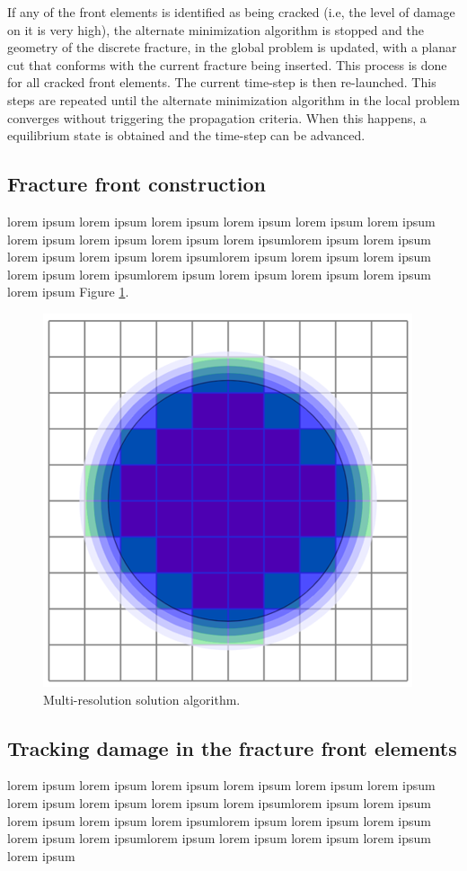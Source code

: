 If any of the front elements is identified as being cracked (i.e, the level of damage on it is very high), the alternate minimization algorithm is stopped and the geometry of the discrete fracture, in the global problem is updated, with a planar cut that conforms with the current fracture being inserted. This process is done for all cracked front elements. The current time-step is then re-launched. This steps are repeated until the alternate minimization algorithm in the local problem converges without triggering the propagation criteria. When this happens, a equilibrium state is obtained and the time-step can be advanced.

\subsection{Fracture front construction}

lorem ipsum lorem ipsum lorem ipsum lorem ipsum lorem ipsum lorem ipsum lorem ipsum lorem ipsum lorem ipsum lorem ipsumlorem ipsum lorem ipsum lorem ipsum lorem ipsum lorem ipsumlorem ipsum lorem ipsum lorem ipsum lorem ipsum lorem ipsumlorem ipsum lorem ipsum lorem ipsum lorem ipsum lorem ipsum Figure \ref{fig:lorem0}.

\begin{figure}[h]
    \centering
    \includegraphics[width=0.5\linewidth]{Chapter4/figures/blue_circle.png}
    \caption{Multi-resolution solution algorithm.}
    \label{fig:lorem0}
\end{figure}

\subsection{Tracking damage in the fracture front elements}

lorem ipsum lorem ipsum lorem ipsum lorem ipsum lorem ipsum lorem ipsum lorem ipsum lorem ipsum lorem ipsum lorem ipsumlorem ipsum lorem ipsum lorem ipsum lorem ipsum lorem ipsumlorem ipsum lorem ipsum lorem ipsum lorem ipsum lorem ipsumlorem ipsum lorem ipsum lorem ipsum lorem ipsum lorem ipsum


